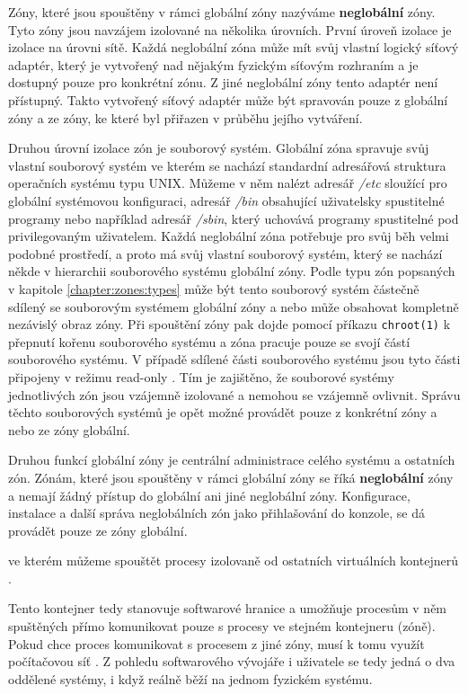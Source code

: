 Zóny, které jsou spouštěny v rámci globální zóny nazýváme \textbf{neglobální} zóny. Tyto zóny jsou navzájem izolované na
několika úrovních. První úroveň izolace je izolace na úrovni sítě. Každá neglobální zóna může mít svůj vlastní logický síťový
adaptér, který je vytvořený nad nějakým fyzickým síťovým rozhraním a je dostupný pouze pro konkrétní zónu. Z jiné neglobální
zóny tento adaptér není přístupný. Takto vytvořený síťový adaptér může být spravován pouze z globální zóny a ze zóny, ke které
byl přiřazen v průběhu jejího vytváření.

Druhou úrovní izolace zón je souborový systém. Globální zóna spravuje svůj vlastní souborový systém ve kterém se nachází
standardní adresářová struktura operačních systému typu UNIX. Můžeme v něm nalézt adresář \textit{/etc} sloužící pro globální
systémovou konfiguraci, adresář \textit{/bin} obsahující uživatelsky spustitelné programy nebo například adresář \textit{/sbin},
který uchovává programy spustitelné pod privilegovaným uživatelem. Každá neglobální zóna potřebuje pro svůj běh velmi podobné
prostředí, a proto má svůj vlastní souborový systém, který se nachází někde v hierarchii souborového systému globální zóny.
Podle typu zón popsaných v kapitole \ref{chapter:zones:types} může být tento souborový systém částečně sdílený se souborovým
systémem globální zóny a nebo může obsahovat kompletně nezávislý obraz zóny. Při spouštění zóny pak dojde pomocí příkazu
\verb|chroot(1)| k přepnutí kořenu souborového systému a zóna pracuje pouze se svojí částí souborového systému. V případě 
sdílené části souborového systému jsou tyto části připojeny v režimu read-only \cite{virt1}. Tím je zajištěno, že souborové
systémy jednotlivých zón jsou vzájemně izolované a nemohou se vzájemně ovlivnit. Správu těchto souborových systémů je opět
možné provádět pouze z konkrétní zóny a nebo ze zóny globální.



Druhou funkcí globální zóny je centrální administrace celého systému a ostatních zón. Zónám, které jsou spouštěny v rámci
globální zóny se říká \textbf{neglobální} zóny a nemají žádný přístup do globální ani jiné neglobální zóny. Konfigurace, 
instalace a další správa neglobálních zón jako přihlašování do konzole, se dá provádět pouze ze zóny globální. 

ve kterém můžeme spouštět procesy izolovaně od ostatních virtuálních kontejnerů
.

Tento kontejner tedy stanovuje
softwarové hranice a umožňuje procesům v něm spuštěných přímo komunikovat pouze s procesy ve stejném kontejneru (zóně). Pokud
chce proces komunikovat s procesem z jiné zóny, musí k tomu využít počítačovou síť \cite{oracle:solaris:zones:introduction}.
Z pohledu softwarového vývojáře i uživatele se tedy jedná o dva oddělené systémy, i když reálně běží na jednom fyzickém
systému.







